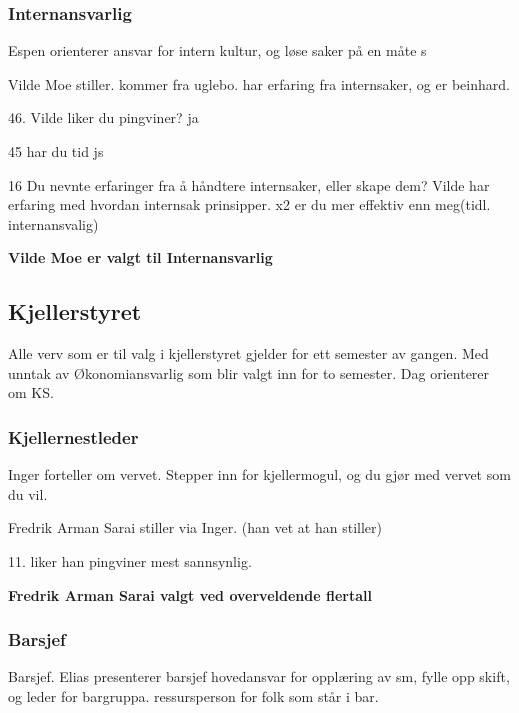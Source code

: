 \documentclass[10pt,norsk,a4paper,usenames,dvipsnames]{article}
\begin{document}
        \subsubsection{Internansvarlig}
        Espen orienterer
        ansvar for intern kultur, og løse saker på en måte s
        
        Vilde Moe stiller. kommer fra uglebo. har erfaring fra internsaker, og er beinhard.
        
        46. Vilde liker du pingviner? ja
        
        45 har du tid js
        
        16 Du nevnte erfaringer fra å håndtere internsaker,  eller skape dem?
        Vilde har erfaring med hvordan internsak prinsipper.
        x2 er du mer effektiv enn meg(tidl. internansvalig)
        
        \textbf{Vilde Moe er valgt til Internansvarlig}
        
    \subsection{Kjellerstyret} %
        Alle verv som er til valg i kjellerstyret gjelder for ett semester av gangen. Med unntak av Økonomiansvarlig som blir valgt inn for to semester.
        Dag orienterer om KS.
        \subsubsection{Kjellernestleder}
        Inger forteller om vervet. Stepper inn for kjellermogul,
        og du gjør med vervet som du vil. 
        
        Fredrik Arman Sarai stiller via Inger. (han vet at han stiller)
        
        11. liker han pingviner
        mest sannsynlig.
        
        \textbf{Fredrik Arman Sarai valgt ved overveldende flertall}
        
        \subsubsection{Barsjef}
        Barsjef.
        Elias presenterer barsjef
        hovedansvar for opplæring av sm, fylle opp skift, og leder for bargruppa. ressursperson for folk som står i bar.
        
\end{document}
